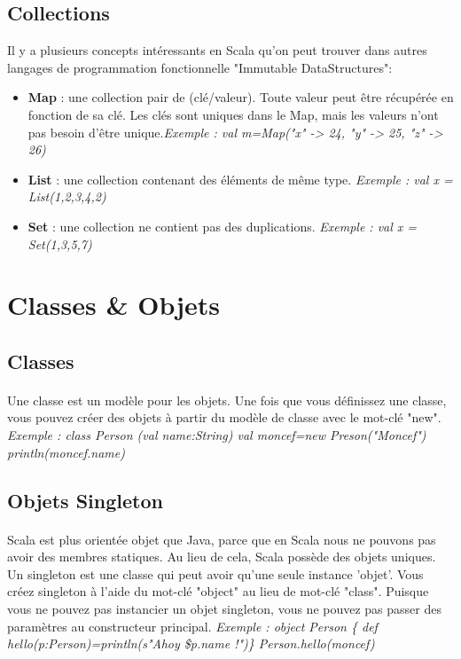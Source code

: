 \subsection{Collections}
Il y a plusieurs concepts intéressants en Scala qu'on peut trouver dans autres langages de programmation fonctionnelle "Immutable DataStructures":
\begin{itemize}
\item \textbf{Map} : une collection pair de (clé/valeur). Toute valeur peut être récupérée en fonction de sa clé. Les clés sont uniques dans le Map, mais les valeurs n'ont pas besoin d'être unique.\textit{Exemple : val m=Map("x" -> 24, "y" -> 25, "z" -> 26)}
\item \textbf{List} : une collection contenant des éléments de même type.   \textit{Exemple : val x = List(1,2,3,4,2)}
\item \textbf{Set } : une collection ne contient pas des duplications. \textit{Exemple : val x = Set(1,3,5,7)}
\end{itemize}
\section{Classes \& Objets}
\subsection{Classes}
\paragraph{}
Une classe est un modèle pour les objets. Une fois que vous définissez une classe, vous pouvez créer des objets à partir du modèle de classe avec le mot-clé "new".\newline
\textit{Exemple : class Person (val name:String)\newline 
val moncef=new Preson("Moncef")\newline
println(moncef.name)}
\subsection{Objets Singleton}
\paragraph{}
Scala est plus orientée objet que Java, parce que en Scala nous ne pouvons pas avoir des membres statiques. Au lieu de cela, Scala possède des objets uniques. Un singleton est une classe qui peut avoir qu'une seule instance 'objet'. Vous créez singleton à l'aide du mot-clé "object" au lieu de mot-clé "class". Puisque vous ne pouvez pas instancier un objet singleton, vous ne pouvez pas passer des paramètres au constructeur principal.
\textit{Exemple : object Person \{ def hello(p:Person)=println(s"Ahoy \$p.name !")\}\newline
Person.hello(moncef)}
